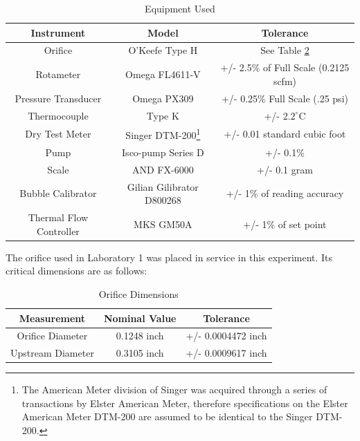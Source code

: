 \documentclass[12pt]{ussci} %
\begin{document}
\begin{appendices}
\begin{table}[h]
	\begin{adjustwidth}{-1in}{-1in}
	\begin{center}
	\begin{tabular}{ | c  c  c |}
	 \hline
	 Instrument & Model & Tolerance \\
	 \hline\hline
	 Orifice & O'Keefe Type H & See Table \ref{tab:orif} \\
	 \hline
	 Rotameter & Omega FL4611-V & +/- 2.5\% of Full Scale (0.2125 scfm)\\
	 \hline
	 Pressure Transducer & Omega PX309 & +/- 0.25\% Full Scale (.25 psi) \\
	 \hline
	 Thermocouple & Type K & +/- \(2.2^\circ\)C \\
	 \hline
	 Dry Test Meter & Singer DTM-200\footnote{The American Meter division of Singer was acquired through a series of transactions by Elster American Meter, therefore 		specifications on the Elster American Meter DTM-200 are assumed to be identical to the Singer DTM-200.} & +/- 0.01 standard cubic foot \\
	 \hline
	 Pump & Isco-pump Series D & +/- 0.1\% \\
	 \hline
	 Scale & AND FX-6000 & +/- 0.1 gram \\
	 \hline
	 Bubble Calibrator & Gilian Gilibrator D800268 & +/- 1\% of reading accuracy \\
	 \hline
	 Thermal Flow Controller & MKS GM50A & +/- 1\% of set point \\
	 \hline
	\end{tabular}
	\caption{Equipment Used}\label{tab:tol}
	\end{center}
	\end{adjustwidth}
\end{table}

The orifice used in Laboratory 1 was placed in service in this experiment.  Its critical dimensions are as follows:

\begin{table}[h]
\begin{center}
\begin{tabular}{ | c  c  c |}
 \hline
 Measurement & Nominal Value & Tolerance \\
 \hline
 Orifice Diameter & 0.1248 inch & +/- 0.0004472 inch \\
 \hline
 Upstream Diameter & 0.3105 inch & +/- 0.0009617 inch \\
 \hline
\end{tabular}
\end{center}
\caption{Orifice Dimensions}\label{tab:orif}
\end{table}


\end{appendices}
\end{document}
